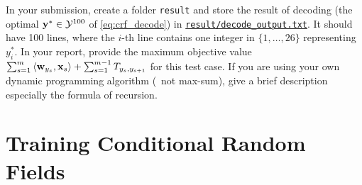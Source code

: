 \documentclass[11pt]{report}
\begin{document}
\begin{itemize}
		\begin{center}
		\end{center}
		
		In your submission, create a folder \verb#result# and store the result of decoding (the optimal $\mathbf{\boldsymbol{y}}^* \in \mathcal{Y}^{100}$ of \eqref{eq:crf_decode}) in \underline{\texttt{result/decode\_output.txt}}.
		It should have 100 lines,
		where the $i$-th line contains one integer in $\{1,\ldots,26\}$ representing $y^*_i$.
		In your report, provide the maximum objective value $\sum_{s=1}^m \left\langle \mathbf{\boldsymbol{w}}_{y_s},\mathbf{\boldsymbol{x}}_s \right\rangle + \sum_{s=1}^{m-1} T_{y_s, y_{s+1}}$ for this test case.
		If you are using your own dynamic programming algorithm (\ie\ not max-sum),
		give a brief description especially the formula of recursion.
	\end{itemize}
	
	
	\section{Training Conditional Random Fields}
	
\end{document}
